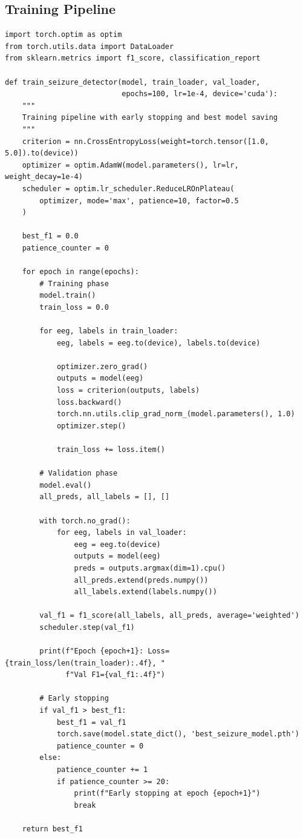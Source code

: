 \documentclass[12pt,a4paper]{article}
\begin{document}
\subsection{Training Pipeline}

\begin{lstlisting}[style=pythonstyle, caption={Training Loop for Seizure Detection}, label={lst:train}]
import torch.optim as optim
from torch.utils.data import DataLoader
from sklearn.metrics import f1_score, classification_report

def train_seizure_detector(model, train_loader, val_loader,
                           epochs=100, lr=1e-4, device='cuda'):
    """
    Training pipeline with early stopping and best model saving
    """
    criterion = nn.CrossEntropyLoss(weight=torch.tensor([1.0, 5.0]).to(device))
    optimizer = optim.AdamW(model.parameters(), lr=lr, weight_decay=1e-4)
    scheduler = optim.lr_scheduler.ReduceLROnPlateau(
        optimizer, mode='max', patience=10, factor=0.5
    )

    best_f1 = 0.0
    patience_counter = 0

    for epoch in range(epochs):
        # Training phase
        model.train()
        train_loss = 0.0

        for eeg, labels in train_loader:
            eeg, labels = eeg.to(device), labels.to(device)

            optimizer.zero_grad()
            outputs = model(eeg)
            loss = criterion(outputs, labels)
            loss.backward()
            torch.nn.utils.clip_grad_norm_(model.parameters(), 1.0)
            optimizer.step()

            train_loss += loss.item()

        # Validation phase
        model.eval()
        all_preds, all_labels = [], []

        with torch.no_grad():
            for eeg, labels in val_loader:
                eeg = eeg.to(device)
                outputs = model(eeg)
                preds = outputs.argmax(dim=1).cpu()
                all_preds.extend(preds.numpy())
                all_labels.extend(labels.numpy())

        val_f1 = f1_score(all_labels, all_preds, average='weighted')
        scheduler.step(val_f1)

        print(f"Epoch {epoch+1}: Loss={train_loss/len(train_loader):.4f}, "
              f"Val F1={val_f1:.4f}")

        # Early stopping
        if val_f1 > best_f1:
            best_f1 = val_f1
            torch.save(model.state_dict(), 'best_seizure_model.pth')
            patience_counter = 0
        else:
            patience_counter += 1
            if patience_counter >= 20:
                print(f"Early stopping at epoch {epoch+1}")
                break

    return best_f1
\end{lstlisting}
\end{document}
